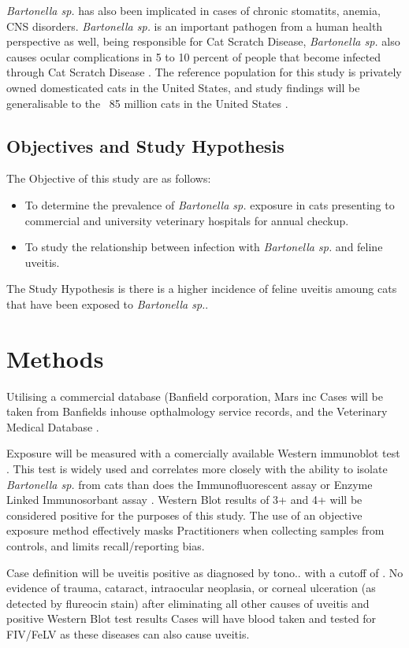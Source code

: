 \documentclass[11pt,twocolumn]{article}
\begin{document}
		\emph{Bartonella sp.} has also been implicated in cases of chronic stomatits, anemia, CNS disorders\cite{Nasir2005}.
		\emph{Bartonella sp.} is an important pathogen from a human health perspective as well, being responsible for Cat Scratch Disease, 
		\emph{Bartonella sp.} also causes ocular complications in 5 to 10 percent of people that become infected through Cat Scratch Disease \cite{Wade2000}.
		The reference population for this study is privately owned domesticated cats in the United States, and study findings will be generalisable to the ~85 million cats in the United States \cite{HSUSown}.

		\subsection{Objectives and Study Hypothesis}
			The Objective of this study are as follows: 
				\begin{itemize}
					\item To determine the prevalence of \emph{Bartonella sp.} exposure in cats presenting to commercial and university veterinary hospitals for annual checkup.
					\item To study the relationship between infection with \emph{Bartonella sp.} and feline uveitis.
				\end{itemize}
			The Study Hypothesis is there is a higher incidence of feline uveitis amoung cats that have been exposed to \emph{Bartonella sp.}.
\section{Methods}
	Utilising a commercial database (Banfield corporation, Mars inc
	Cases will be taken from Banfields inhouse opthalmology service records, and the Veterinary Medical Database \cite{UniversityVeterinary}.

	Exposure will be measured with a comercially available Western immunoblot test \cite{febart}. This test is widely used and correlates more closely with the ability to isolate \emph{Bartonella sp.} from cats than does the Immunofluorescent assay or Enzyme Linked Immunosorbant assay \cite{Jr1995}. 
	Western Blot results of 3+ and 4+ will be considered positive for the purposes of this study. 
	The use of an objective exposure method effectively masks Practitioners when collecting samples from controls, and limits recall/reporting bias.


	Case definition will be uveitis positive as diagnosed by tono.. with a cutoff of .
	No evidence of trauma, cataract, intraocular neoplasia, or corneal ulceration (as detected by flureocin stain) 
	after eliminating all other causes of uveitis and positive Western Blot test results
	Cases will have blood taken and tested for FIV/FeLV as these diseases can also cause uveitis.
\end{document}
